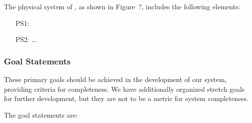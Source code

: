 
The physical system of \progname{}, as shown in Figure~?,
includes the following elements:

\begin{itemize}

\item[PS1:] 

\item[PS2:] ...

\end{itemize}

\fi

\subsubsection{Goal Statements}

These primary goals should be achieved in the development of our system, providing criteria for completeness. We have additionally organized stretch goals for further development, but they are not to be a metric for system completeness.

The goal statements are:

